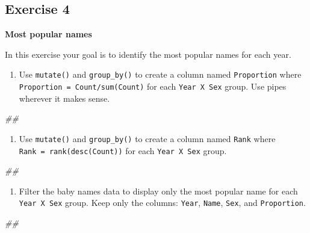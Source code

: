 \documentclass[]{book}
\newenvironment{Shaded}{\begin{snugshade}}{\end{snugshade}}
\newcommand{\CommentTok}[1]{\textcolor[rgb]{0.56,0.35,0.01}{\textit{#1}}}
\providecommand{\tightlist}{%
  \setlength{\itemsep}{0pt}\setlength{\parskip}{0pt}}
\begin{document}
\hypertarget{exercise-4}{%
\subsection{Exercise 4}\label{exercise-4}}

\textbf{Most popular names}

In this exercise your goal is to identify the most popular names for each year.

\begin{enumerate}
\def\labelenumi{\arabic{enumi}.}
\tightlist
\item
  Use \texttt{mutate()} and \texttt{group\_by()} to create a column named \texttt{Proportion}
  where \texttt{Proportion\ =\ Count/sum(Count)} for each \texttt{Year\ X\ Sex} group.
  Use pipes wherever it makes sense.
\end{enumerate}

\begin{Shaded}
\begin{Highlighting}[]
\CommentTok{## }
\end{Highlighting}
\end{Shaded}

\begin{enumerate}
\def\labelenumi{\arabic{enumi}.}
\setcounter{enumi}{1}
\tightlist
\item
  Use \texttt{mutate()} and \texttt{group\_by()} to create a column named \texttt{Rank} where
  \texttt{Rank\ =\ rank(desc(Count))} for each \texttt{Year\ X\ Sex} group.
\end{enumerate}

\begin{Shaded}
\begin{Highlighting}[]
\CommentTok{##}
\end{Highlighting}
\end{Shaded}

\begin{enumerate}
\def\labelenumi{\arabic{enumi}.}
\setcounter{enumi}{2}
\tightlist
\item
  Filter the baby names data to display only the most popular name
  for each \texttt{Year\ X\ Sex} group. Keep only the columns: \texttt{Year}, \texttt{Name},
  \texttt{Sex}, and \texttt{Proportion}.
\end{enumerate}

\begin{Shaded}
\begin{Highlighting}[]
\CommentTok{##}
\end{Highlighting}
\end{Shaded}
\end{document}
